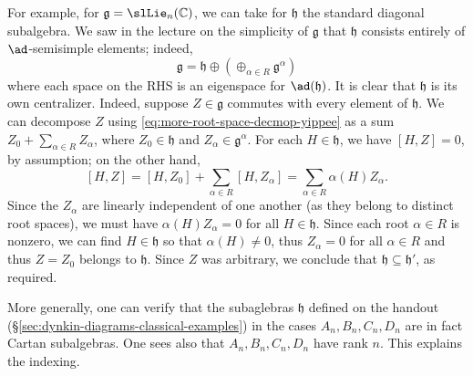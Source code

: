 \documentclass[reqno]{amsart} 
\begin{document}
\begin{enumerate}
  For example, for $\mathfrak{g} = \slLie_n(\mathbb{C})$, we can take for $\mathfrak{h}$ the standard diagonal subalgebra.  We saw in the lecture on the simplicity of $\mathfrak{g}$ that $\mathfrak{h}$ consists entirely of $\ad$-semisimple elements; indeed,
  \begin{equation}\label{eq:more-root-space-decmop-yippee}
    \mathfrak{g} = \mathfrak{h} \oplus (\oplus_{\alpha \in R} \mathfrak{g}^\alpha)
  \end{equation}
  where each space on the RHS is an eigenspace for $\ad(\mathfrak{h})$.  It is clear that $\mathfrak{h}$ is its own centralizer.  Indeed, suppose $Z \in \mathfrak{g}$ commutes with every element of $\mathfrak{h}$.  We can decompose $Z$ using \eqref{eq:more-root-space-decmop-yippee} as a sum $Z_0 + \sum_{\alpha \in R} Z_\alpha$, where $Z_0 \in \mathfrak{h}$ and $Z_\alpha \in \mathfrak{g}^\alpha$.  For each $H \in \mathfrak{h}$, we have $[H,Z] = 0$, by assumption; on the other hand,
  \begin{equation}\label{eq:eigenspace-decomp-relevant-fro-checking-maximality}
 [H,Z]
    = [H,Z_0] + \sum_{\alpha \in R} [H,Z_\alpha]
    = \sum_{\alpha \in R} \alpha(H) Z_\alpha.
  \end{equation}
  Since the $Z_\alpha$ are linearly independent of one another (as they belong to distinct root spaces), we must have $\alpha(H) Z_\alpha = 0$ for all $H \in \mathfrak{h}$.  Since each root $\alpha \in R$ is nonzero, we can find $H \in \mathfrak{h}$ so that $\alpha(H) \neq 0$, thus $Z_\alpha = 0$ for all $\alpha \in R$ and thus $Z = Z_0$ belongs to $\mathfrak{h}$.  Since $Z$ was arbitrary, we conclude that $\mathfrak{h} \subseteq \mathfrak{h} '$, as required.

  More generally, one can verify that the subaglebras $\mathfrak{h}$ defined on the handout (\S\ref{sec:dynkin-diagrams-classical-examples}) in the cases $A_n,B_n,C_n,D_n$ are in fact Cartan subalgebras.  One sees also that $A_n, B_n, C_n, D_n$ have rank $n$.  This explains the indexing.


\end{enumerate}
\end{document}
